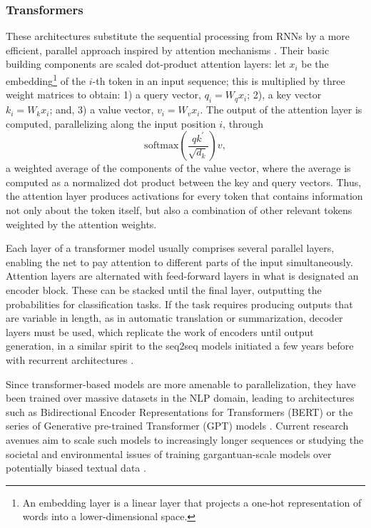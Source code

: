 \subsubsection{Transformers} These architectures substitute the sequential processing from RNNs by a more efficient, parallel approach inspired by 
attention mechanisms \cite{vaswani2017attention,bahdanau2014neural}. Their basic building components are scaled dot-product attention layers:
let $x_i$ be the embedding\footnote{An embedding layer is a linear layer that projects a one-hot representation of words into a lower-dimensional space.} of the $i$-th token in an input sequence;
this is multiplied by three weight matrices to obtain: 1) a query vector, $q_i = W_q x_i$; 2), 
 a key vector $k_i = W_k x_i$;
 and, 3) a value vector, $v_i = W_v x_i$. The output of the attention layer is computed, parallelizing along the input position $i$, 
 through 
$$
\mbox{softmax}\left(\frac{q k^{'}}{\sqrt{d_k}}\right) v,
$$
 a weighted average of the components of the value vector, where the average is 
computed as a normalized dot product between the key and query vectors. Thus, the attention layer produces activations for every token  that contains information not only about the token itself, but also a combination of other relevant tokens weighted by the attention weights.

Each layer of a transformer model usually comprises several 
parallel layers, enabling the net to pay attention to different parts of the input simultaneously. Attention layers are alternated with  feed-forward layers in what is designated an encoder block. These 
 can be stacked until the final layer, outputting the probabilities for classification tasks. If the task requires producing outputs that are variable in length, as in automatic translation or summarization, decoder layers must be used, which replicate the work of encoders until output generation, in a similar spirit to the seq2seq models initiated a few years before with recurrent architectures \cite{sutskever2014sequence}.

Since transformer-based models are more amenable to parallelization,
 they have been trained over massive datasets in the NLP domain, leading to architectures such as Bidirectional 
Encoder Representations for Transformers (BERT) \cite{devlin2018bert}
or the series of Generative
pre-trained Transformer (GPT) models \cite{radford2018improving, radford2019language, brown2020language}. Current research avenues aim to scale such models to increasingly longer sequences \cite{tay2020long} or studying the societal and environmental issues of training gargantuan-scale models over potentially biased textual data \cite{bender2021dangers}.


